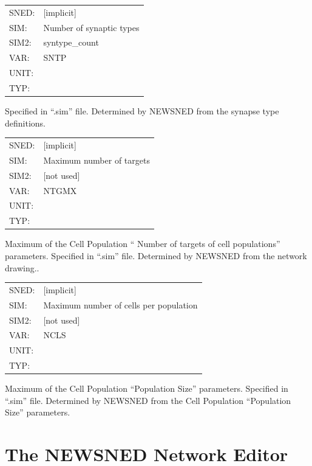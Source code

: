 \documentclass[12pt,openany,oneside]{book}
\begin{document}
\begin{flushleft}
\begin{tabular}{@{}ll@{}}
SNED: & [implicit]\\
SIM: & Number of synaptic types\\
SIM2: & syntype\_count\\
VAR: & SNTP\\
UNIT: &\\
TYP: &\\
\end{tabular}
\end{flushleft}
\noindent
Specified in ``.sim'' file.  Determined by NEWSNED from the synapse
type definitions.
\filbreak
\vspace{\baselineskip}

\begin{flushleft}
\begin{tabular}{@{}ll@{}}
SNED: & [implicit]\\
SIM: & Maximum number of targets\\
SIM2: & [not used]\\
VAR: & NTGMX\\
UNIT: &\\
TYP: &\\
\end{tabular}
\end{flushleft}
\noindent
Maximum of the Cell Population `` Number of targets of cell
populations'' parameters.  Specified in ``.sim'' file.  Determined by
NEWSNED from the network drawing..
\filbreak
\vspace{\baselineskip}

\begin{flushleft}
\begin{tabular}{@{}ll@{}}
SNED: & [implicit]\\
SIM: & Maximum number of cells per population\\
SIM2: & [not used]\\
VAR: & NCLS\\
UNIT: &\\
TYP: &\\
\end{tabular}
\end{flushleft}
\noindent
Maximum of the Cell Population ``Population Size'' parameters.
Specified in ``.sim'' file.  Determined by NEWSNED from the Cell
Population ``Population Size'' parameters.
\filbreak
\vspace{\baselineskip}

\section{The NEWSNED Network Editor}
\end{document}
